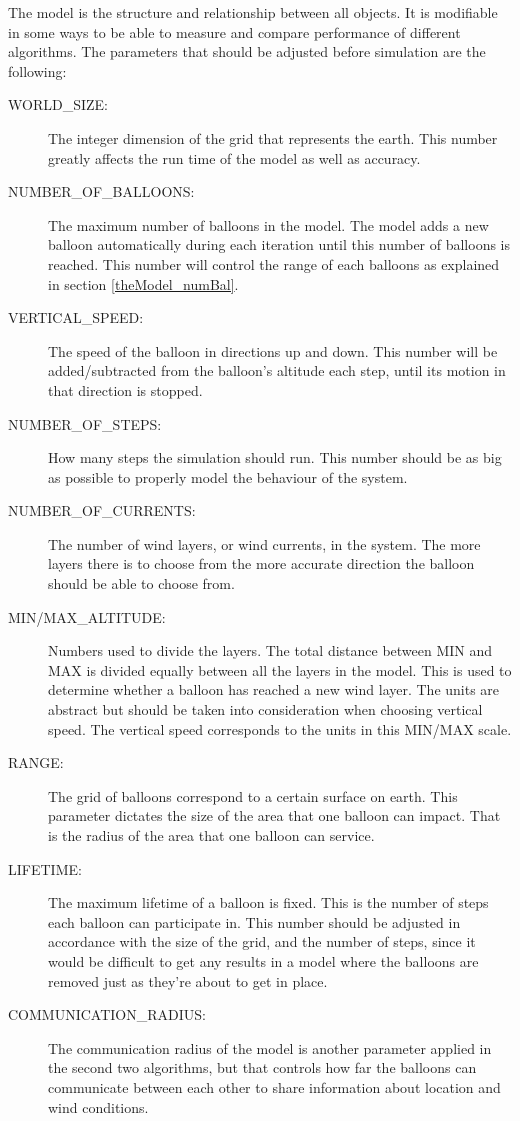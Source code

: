 The model is the structure and relationship between all objects. It is modifiable in some ways to be able to measure and compare performance of different algorithms. The parameters that should be adjusted before simulation are the following:

\begin{description}
\item[WORLD\_SIZE:] The integer dimension of the grid that represents the earth. This number greatly affects the run time of the model as well as accuracy. 
\item[NUMBER\_OF\_BALLOONS:] The maximum number of balloons in the model. The model adds a new balloon automatically during each iteration until this number of balloons is reached. This number will control the range of each balloons as explained in section \ref{theModel_numBal}.
\item[VERTICAL\_SPEED:] The speed of the balloon in directions up and down. This number will be added/subtracted from the balloon's altitude each step, until its motion in that direction is stopped.
\item[NUMBER\_OF\_STEPS:] How many steps the simulation should run. This number should be as big as possible to properly model the behaviour of the system. 
\item[NUMBER\_OF\_CURRENTS:] The number of wind layers, or wind currents, in the system. The more layers there is to choose from the more accurate direction the balloon should be able to choose from.
\item[MIN/MAX\_ALTITUDE:] Numbers used to divide the layers. The total distance between MIN and MAX is divided equally between all the layers in the model. This is used to determine whether a balloon has reached a new wind layer. The units are abstract but should be taken into consideration when choosing vertical speed. The vertical speed corresponds to the units in this MIN/MAX scale.
\item[RANGE: ] The grid of balloons correspond to a certain surface on earth. This parameter dictates the size of the area that one balloon can impact. That is the radius of the area that one balloon can service. 
\item[LIFETIME: ] The maximum lifetime of a balloon is fixed. This is the number of steps each balloon can participate in. This number should be adjusted in accordance with the size of the grid, and the number of steps, since it would be difficult to get any results in a model where the balloons are removed just as they're about to get in place. 
\item[COMMUNICATION\_RADIUS: ] The communication radius of the model is another parameter applied in the second two algorithms, but that controls how far the balloons can communicate between each other to share information about location and wind conditions.
\end{description}
